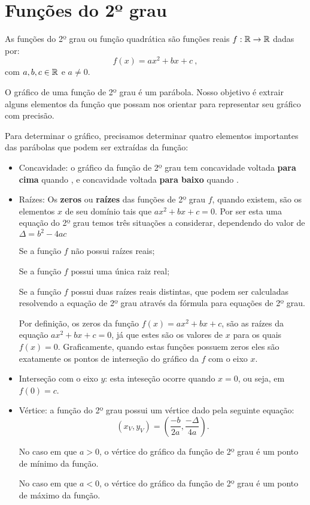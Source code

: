 \chapter{Funções do 2º grau}
As funções do 2º grau ou função quadrática são funções reais $f: \mathbb{R} \rightarrow \mathbb{R}$ dadas por:
\begin{equation*}
f(x)= ax^2 + bx + c \ ,
\end{equation*}
com $a, b, c \in \mathbb{R}$ e $a \neq 0$. 

O gráfico de uma função de 2º grau é um parábola. Nosso objetivo é extrair alguns elementos da função que possam nos orientar para representar seu gráfico com precisão.

Para determinar o gráfico, precisamos determinar quatro elementos importantes das parábolas que podem ser extraídas da função:

\begin{itemize}
    \item Concavidade: o gráfico da função de 2º grau tem concavidade voltada \textbf{para cima} quando , e concavidade voltada \textbf{para baixo} quando .
    
    \item Raízes: Os \textbf{zeros} ou \textbf{raízes} das funções de 2º grau $f$, quando existem, são os elementos $x$ de seu domínio tais que $ax^2+bx+c=0$. Por ser esta uma equação do 2º grau temos três situações a considerar, dependendo do valor de $\Delta=b^2-4ac$

 Se  a função $f$ não possui raízes reais;

 Se  a função $f$ possui uma única raiz real;

 Se  a função $f$ possui duas raízes reais distintas, que podem ser calculadas resolvendo a equação de 2º grau através da fórmula para equações de 2º grau.

 Por definição, os zeros da função $f(x)= ax^2+bx+c$, são as raízes da equação $ax^2+bx+c=0$, já que estes são os valores de $x$ para os quais $f(x)=0$. Graficamente, quando estas funções possuem zeros eles são exatamente os pontos de interseção do gráfico da $f$ com o eixo $x$.
 
    \item Interseção com o eixo $y$: esta inteseção ocorre quando $x=0$, ou seja, em $f(0)=c$.
    
    \item Vértice: a função do 2º grau possui um vértice dado pela seguinte equação:
\begin{equation*}
(x_V,y_V)= \left(\frac{- b}{2a}, \frac{- \Delta}{4a} \right).
\end{equation*}

 No caso em que $a > 0$, o vértice do gráfico da função de 2º grau é um ponto de mínimo da função.

 No caso em que $a < 0$, o vértice do gráfico da função de 2º grau é um ponto de máximo da função.
\end{itemize}
 
